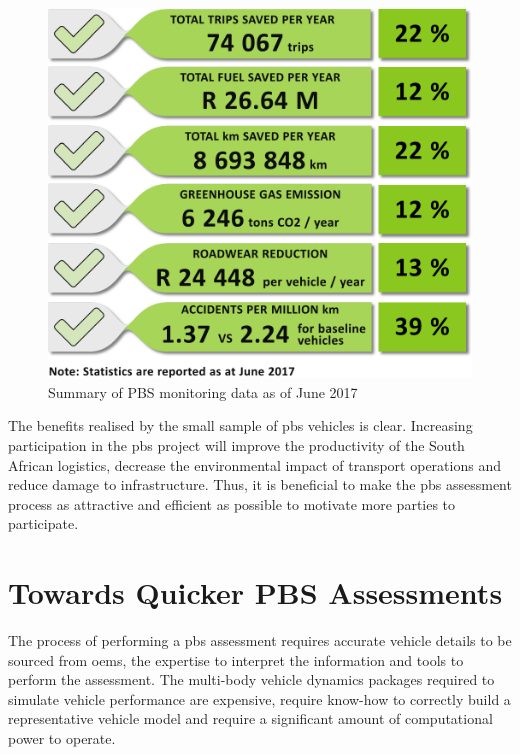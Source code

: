     \begin{figure}
        \centering
        \includegraphics[width=1\textwidth]{fig/pbs-pilot_yearly-statistics-june-2017}
        \caption{Summary of PBS monitoring data as of June 2017 \cite{Nordengen2018}}
        \label{figure:summary-of-pbs-monitoring-data-june-2017}
    \end{figure}

  The benefits realised by the small sample of \gls{pbs} vehicles is clear. Increasing participation in the \gls{pbs} project will improve the productivity of the South African logistics, decrease the environmental impact of transport operations and reduce damage to infrastructure. Thus, it is beneficial to make the \gls{pbs} assessment process as attractive and efficient as possible to motivate more parties to participate.

\section{Towards Quicker PBS Assessments}\label{section:towards-quicker-pbs-assessments}

The process of performing a \gls{pbs} assessment requires accurate vehicle details to be sourced from \glspl{oem}, the expertise to interpret the information and tools to perform the assessment. The multi-body vehicle dynamics packages required to simulate vehicle performance are expensive, require know-how to correctly build a representative vehicle model and require a significant amount of computational power to operate. 

